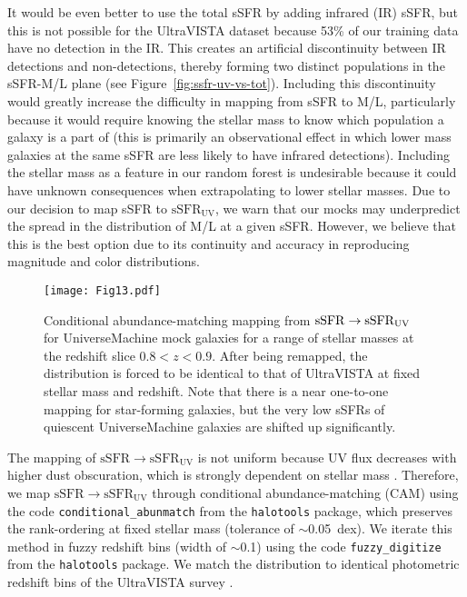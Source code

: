 \documentclass[twocolumn,twocolappendix]{aastex63}
\newcommand{\ssfruv}{$\mathrm{sSFR_{UV}}$}
\begin{document}
It would be even better to use the total sSFR by adding infrared (IR) sSFR, but this is not possible for the UltraVISTA dataset because 53\% of our training data have no detection in the IR. This creates an artificial discontinuity between IR detections and non-detections, thereby forming two distinct populations in the sSFR-M/L plane (see Figure~\ref{fig:ssfr-uv-vs-tot}). Including this discontinuity would greatly increase the difficulty in mapping from sSFR to M/L, particularly because it would require knowing the stellar mass to know which population a galaxy is a part of (this is primarily an observational effect in which lower mass galaxies at the same sSFR are less likely to have infrared detections). Including the stellar mass as a feature in our random forest is undesirable because it could have unknown consequences when extrapolating to lower stellar masses. Due to our decision to map sSFR to \ssfruv, we warn that our mocks may underpredict the spread in the distribution of M/L at a given sSFR. However, we believe that this is the best option due to its continuity and accuracy in reproducing magnitude and color distributions.

\begin{figure}[ht!]
\texttt{[image: Fig13.pdf]}
\caption{Conditional abundance-matching mapping from $\rm sSFR \rightarrow sSFR_{UV}$ for UniverseMachine mock galaxies for a range of stellar masses at the redshift slice $0.8<z<0.9$. After being remapped, the distribution is forced to be identical to that of UltraVISTA at fixed stellar mass and redshift. Note that there is a near one-to-one mapping for star-forming galaxies, but the very low sSFRs of quiescent UniverseMachine galaxies are shifted up significantly.
\label{fig:cam}}
\end{figure}

The mapping of $\mathrm{sSFR \rightarrow sSFR_{UV}}$ is not uniform because UV flux decreases with higher dust obscuration, which is strongly dependent on stellar mass \citep{Whitaker:2017}. Therefore, we map $\mathrm{sSFR \rightarrow sSFR_{UV}}$ through conditional abundance-matching (CAM) using the code \verb|conditional_abunmatch| from the \verb|halotools| package, which preserves the rank-ordering at fixed stellar mass (tolerance of $\sim$0.05~dex). We iterate this method in fuzzy redshift bins (width of $\sim$0.1) using the code \verb|fuzzy_digitize| from the \verb|halotools| package.
We match the distribution to identical photometric redshift bins of the UltraVISTA survey \citep{Muzzin:2013}.
\end{document}
